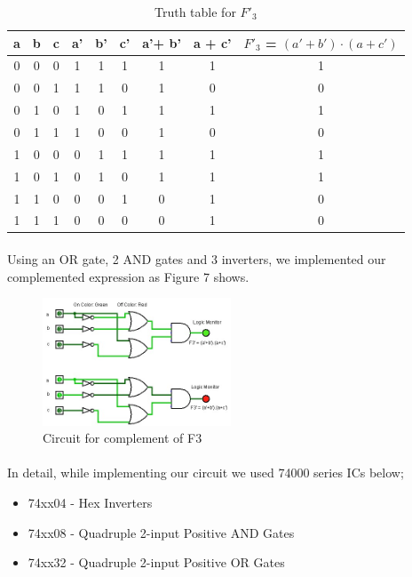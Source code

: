 \documentclass[pdftex,12pt,a4paper]{article}
\begin{document}
\begin{table}[h]
\centering
\begin{tabular}{|c|c|c|c|c|c|c|c|c|}
\hline
a & b & c & a' & b' & c' & a'+ b' & a + c' & $F'_{3}$ = $(a' + b') \cdot (a + c')$ \\ \hline
0 & 0 & 0 & 1  & 1  & 1     & 1      & 1             & 1        \\ 
0 & 0 & 1 & 1  & 1  & 0     & 1      & 0             & 0        \\ 
0 & 1 & 0 & 1  & 0  & 1     & 1      & 1             & 1        \\ 
0 & 1 & 1 & 1  & 0  & 0     & 1      & 0             & 0        \\ 
1 & 0 & 0 & 0  & 1  & 1     & 1      & 1             & 1        \\ 
1 & 0 & 1 & 0  & 1  & 0     & 1      & 1             & 1        \\
1 & 1 & 0 & 0  & 0  & 1     & 0      & 1             & 0        \\ 
1 & 1 & 1 & 0  & 0  & 0     & 0      & 1             & 0        \\ \hline
\end{tabular}
\caption{Truth table for $F'_{3}$}
\label{Table 4}
\end{table}

\clearpage
\paragraph{}
Using an OR gate, 2 AND gates and 3 inverters, we implemented our complemented expression as Figure 7 shows.

\begin{figure}[!h]
	\centering
	\includegraphics[width=0.5\textwidth]{E2P3.1.1.jpg}	
	\caption{Circuit for complement of F3}
	\label{Figure 7}
\end{figure}

\paragraph{}
In detail, while implementing our circuit we used 74000 series ICs below;
\begin{itemize}
    \item 74xx04 - Hex Inverters
    \item 74xx08 - Quadruple 2-input Positive AND Gates
    \item 74xx32 - Quadruple 2-input Positive OR Gates
\end{itemize}
\end{document}
